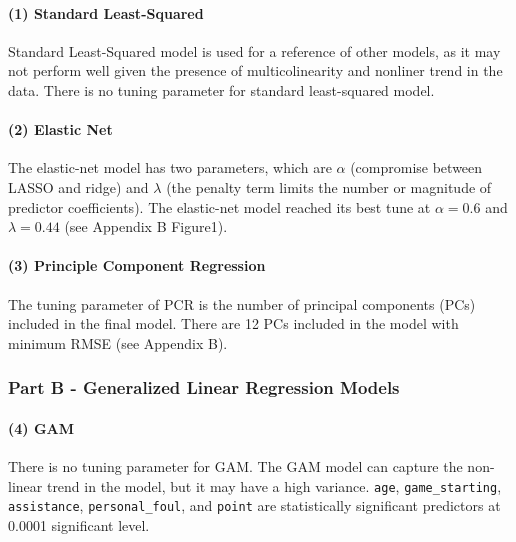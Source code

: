 \documentclass[
]{article}
\begin{document}
\hypertarget{standard-least-squared}{%
\paragraph{(1) Standard Least-Squared}\label{standard-least-squared}}

Standard Least-Squared model is used for a reference of other models, as
it may not perform well given the presence of multicolinearity and
nonliner trend in the data. There is no tuning parameter for standard
least-squared model.

\hypertarget{elastic-net}{%
\paragraph{(2) Elastic Net}\label{elastic-net}}

The elastic-net model has two parameters, which are \(\alpha\)
(compromise between LASSO and ridge) and \(\lambda\) (the penalty term
limits the number or magnitude of predictor coefficients). The
elastic-net model reached its best tune at \(\alpha = 0.6\) and
\(\lambda = 0.44\) (see Appendix B Figure1).

\hypertarget{principle-component-regression}{%
\paragraph{(3) Principle Component
Regression}\label{principle-component-regression}}

The tuning parameter of PCR is the number of principal components (PCs)
included in the final model. There are 12 PCs included in the model with
minimum RMSE (see Appendix B).

\hypertarget{part-b---generalized-linear-regression-models}{%
\subsubsection{Part B - Generalized Linear Regression
Models}\label{part-b---generalized-linear-regression-models}}

\hypertarget{gam}{%
\paragraph{(4) GAM}\label{gam}}

There is no tuning parameter for GAM. The GAM model can capture the
non-linear trend in the model, but it may have a high variance.
\texttt{age}, \texttt{game\_starting}, \texttt{assistance},
\texttt{personal\_foul}, and \texttt{point} are statistically
significant predictors at 0.0001 significant level.
\end{document}
